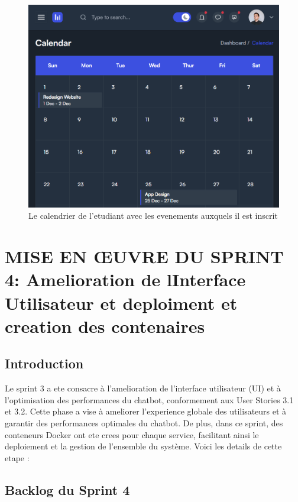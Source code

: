 \documentclass[a4paper, 11pt, openany]{report}
\begin{document}
\begin{figure}
\centering
\includegraphics[width=\textwidth]{assets/images/calendar.png} 
\caption{Le calendrier de l'etudiant avec les evenements auxquels il est inscrit}
\label{fig:calender}
\end{figure}



\clearpage

\chapter{MISE EN ŒUVRE DU SPRINT 4: Amelioration de lInterface Utilisateur et  deploiment et creation des contenaires}


\section{Introduction}
Le sprint 3 a ete consacre à l'amelioration de l'interface utilisateur (UI) et à l'optimisation des performances du chatbot, conformement aux User Stories 3.1 et 3.2. Cette phase a vise à ameliorer l'experience globale des utilisateurs et à garantir des performances optimales du chatbot. De plus, dans ce sprint, des conteneurs Docker ont ete crees pour chaque service, facilitant ainsi le deploiement et la gestion de l'ensemble du système. Voici les details de cette etape :


\section{Backlog du Sprint 4}
\end{document}
